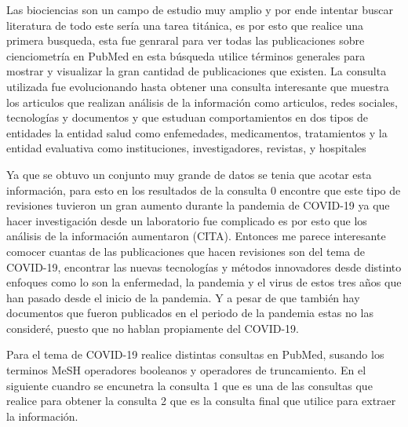 \smallskip
Las biociencias son un campo de estudio muy amplio y por ende intentar buscar literatura de todo este sería una tarea titánica, 
es por esto que realice una primera busqueda, esta fue genraral para ver todas las publicaciones sobre cienciometría en PubMed 
en esta búsqueda utilice términos generales para mostrar y visualizar la gran cantidad de publicaciones que existen. 
La consulta utilizada fue evolucionando hasta obtener una consulta interesante que muestra los articulos que realizan análisis
de la información como articulos, redes sociales, tecnologías y documentos y que estuduan comportamientos en dos tipos de entidades 
la entidad salud como enfemedades, medicamentos, tratamientos y la entidad evaluativa como instituciones, investigadores, revistas, 
y hospitales\\

\smallskip
Ya que se obtuvo un conjunto muy grande de datos se tenia que acotar esta información, para esto en los resultados de la consulta 0
encontre que este tipo de revisiones tuvieron un gran aumento durante la pandemia de COVID-19 ya que hacer investigación desde un laboratorio
 fue complicado es por esto que los análisis de la información aumentaron (CITA).
 Entonces me parece interesante comocer cuantas de las publicaciones que hacen revisiones son del
 tema de COVID-19, encontrar las nuevas tecnologías y métodos innovadores desde
 distinto enfoques como lo son la enfermedad, la pandemia y el virus de estos tres años que han pasado desde el inicio de la pandemia.
 Y a pesar de que también hay documentos que fueron publicados en el periodo de la pandemia estas no las consideré, 
 puesto que no hablan propiamente del COVID-19.

\smallskip
Para el tema de COVID-19 realice distintas consultas en PubMed, susando los terminos MeSH operadores booleanos y 
operadores de truncamiento. En el siguiente cuandro se encunetra la consulta 1 que es una de las consultas que realice 
para obtener la consulta 2 que es la consulta final que utilice para extraer la información.\\

\noindent
{}

